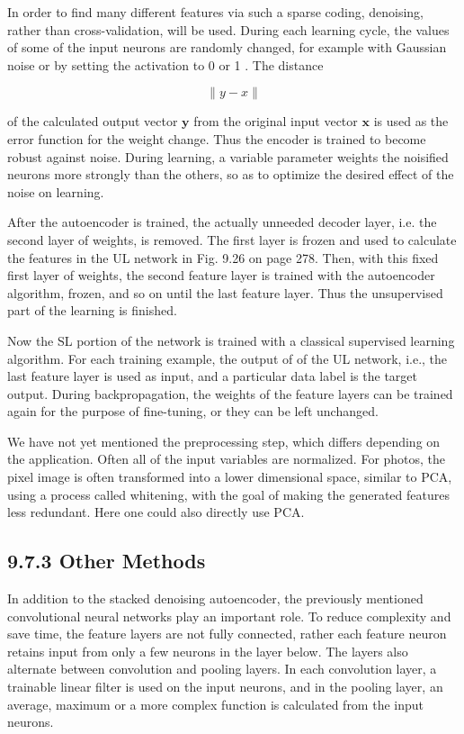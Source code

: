 \documentclass[10pt]{article}
\begin{document}
In order to find many different features via such a sparse coding, denoising, rather than cross-validation, will be used. During each learning cycle, the values of some of the input neurons are randomly changed, for example with Gaussian noise or by setting the activation to 0 or 1 . The distance


$$
\|y-x\|
$$

of the calculated output vector $\boldsymbol{y}$ from the original input vector $\boldsymbol{x}$ is used as the error function for the weight change. Thus the encoder is trained to become robust against noise. During learning, a variable parameter weights the noisified neurons more strongly than the others, so as to optimize the desired effect of the noise on learning.

After the autoencoder is trained, the actually unneeded decoder layer, i.e. the second layer of weights, is removed. The first layer is frozen and used to calculate the features in the UL network in Fig. 9.26 on page 278. Then, with this fixed first layer of weights, the second feature layer is trained with the autoencoder algorithm, frozen, and so on until the last feature layer. Thus the unsupervised part of the learning is finished.

Now the SL portion of the network is trained with a classical supervised learning algorithm. For each training example, the output of of the UL network, i.e., the last feature layer is used as input, and a particular data label is the target output. During backpropagation, the weights of the feature layers can be trained again for the purpose of fine-tuning, or they can be left unchanged.

We have not yet mentioned the preprocessing step, which differs depending on the application. Often all of the input variables are normalized. For photos, the pixel image is often transformed into a lower dimensional space, similar to PCA, using a process called whitening, with the goal of making the generated features less redundant. Here one could also directly use PCA.

\subsection*{9.7.3 Other Methods}
In addition to the stacked denoising autoencoder, the previously mentioned convolutional neural networks play an important role. To reduce complexity and save time, the feature layers are not fully connected, rather each feature neuron retains input from only a few neurons in the layer below. The layers also alternate between convolution and pooling layers. In each convolution layer, a trainable linear filter is used on the input neurons, and in the pooling layer, an average, maximum or a more complex function is calculated from the input neurons.
\end{document}
